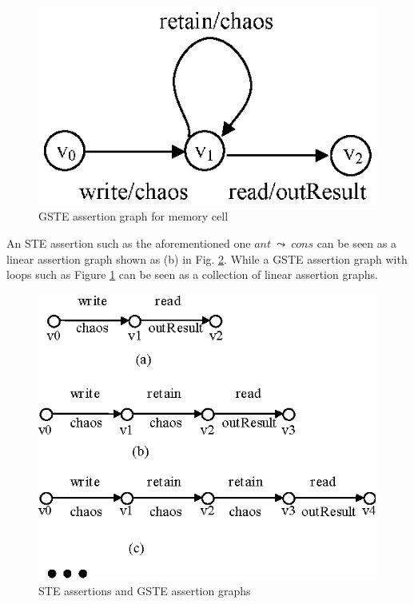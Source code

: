 \documentclass[final]{IEEEtran}
\begin{document}
 \begin{figure}[tbph]
 \begin{center}
 \includegraphics[width=.4\textwidth]{memoryGraph.eps}
 \end{center}
 \caption{GSTE assertion graph for memory cell}
 \label{fig:memoryGsteGraph}
 \end{figure}


 An STE assertion such as the aforementioned one $ant\ \leadsto\
 cons$ can be seen as a linear assertion graph shown as (b) in Fig.
 \ref{fig:gsteGrapgCollections}. While a  GSTE assertion
 graph with loops such as Figure \ref{fig:memoryGsteGraph} can
 be seen as a collection of linear assertion graphs.

 \begin{figure}[tbph]
 \begin{center}
 \includegraphics[width=.4\textwidth]{gsteCollections.eps}
 \end{center}
 \caption{STE assertions and GSTE assertion graphs}
 \label{fig:gsteGrapgCollections}
 \end{figure}
\end{document}
